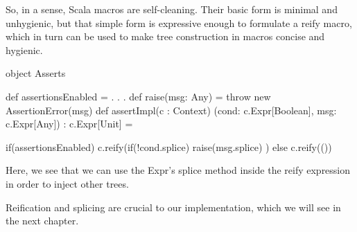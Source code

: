 So, in a sense, Scala macros are self-cleaning. Their basic form is minimal
and unhygienic, but that simple form is expressive enough to formulate a
reify macro, which in turn can be used to make tree construction in macros
concise and hygienic.

object Asserts {
  def assertionsEnabled = . . .
  def raise(msg: Any) = throw new AssertionError(msg)
  def assertImpl(c : Context)
    (cond: c.Expr[Boolean], msg: c.Expr[Any])
    : c.Expr[Unit] = 
    
    if(assertionsEnabled)
      c.reify(if(!cond.splice) raise(msg.splice) )
    else
      c.reify(())
}

Here, we see that we can use the Expr's splice method inside the reify
expression in order to inject other trees.

Reification and splicing are crucial to our implementation, which we will see in
the next chapter.